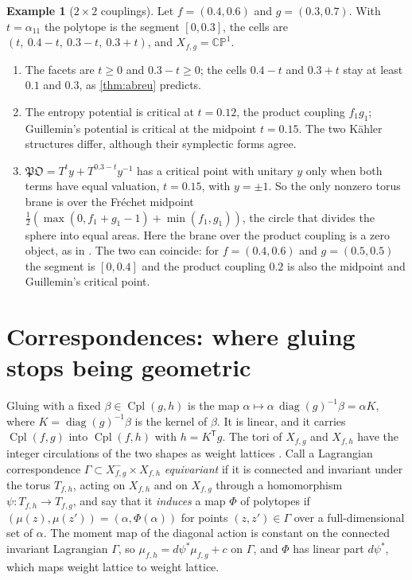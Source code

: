 \documentclass[11pt]{article}
\theoremstyle{definition}
\newtheorem{example}[theorem]{Example}
\theoremstyle{remark}
\newcommand{\Cpl}{\operatorname{Cpl}}
\newcommand{\diag}{\operatorname{diag}}
\newcommand{\T}{\mathsf T}
\begin{document}
\begin{example}[$2\times2$ couplings]\label{ex:twobytwo}
Let $f=(0.4,0.6)$ and $g=(0.3,0.7)$. With $t=\alpha_{11}$ the polytope is the segment $[0,0.3]$, the cells are
$(t,\ 0.4-t,\ 0.3-t,\ 0.3+t)$, and $X_{f,g}=\mathbb{CP}^1$.
\begin{enumerate}[label=(\roman*)]
\item The facets are $t\ge0$ and $0.3-t\ge0$; the cells $0.4-t$ and $0.3+t$ stay at least $0.1$ and $0.3$, as \cref{thm:abreu} predicts.
\item The entropy potential is critical at $t=0.12$, the product coupling $f_1g_1$; Guillemin's potential is critical at the midpoint
  $t=0.15$. The two Kähler structures differ, although their symplectic forms agree.
\item $\mathfrak{PO}=T^{t}y+T^{0.3-t}y^{-1}$ has a critical point with unitary $y$ only when both terms have equal valuation, $t=0.15$,
  with $y=\pm1$. So the only
  nonzero torus brane is over the Fréchet midpoint $\frac12(\max(0,f_1+g_1-1)+\min(f_1,g_1))$, the circle that divides the sphere into
  equal areas. Here the brane over the product coupling is a zero object, as in \cite[Prop.~10.11]{Conditionals}. The two can
  coincide: for $f=(0.4,0.6)$ and $g=(0.5,0.5)$ the segment is $[0,0.4]$ and the product coupling $0.2$ is also the midpoint and
  Guillemin's critical point.
\end{enumerate}
\end{example}

\section{Correspondences: where gluing stops being geometric}\label{sec:correspondences}

Gluing with a fixed $\beta\in\Cpl(g,h)$ is the map $\alpha\mapsto\alpha\,\diag(g)^{-1}\beta=\alpha K$, where $K=\diag(g)^{-1}\beta$ is the
kernel of $\beta$. It is linear, and it carries $\Cpl(f,g)$ into $\Cpl(f,h)$ with $h=K^\T g$. The tori of $X_{f,g}$ and $X_{f,h}$ have the
integer circulations of the two shapes as weight lattices \cite[Thm.~6.4]{Conditionals}. Call a Lagrangian correspondence
$\Gamma\subset X_{f,g}^-\times X_{f,h}$ \emph{equivariant} if it is connected and invariant under the torus $T_{f,h}$, acting on $X_{f,h}$ and on
$X_{f,g}$ through a homomorphism $\psi\colon T_{f,h}\to T_{f,g}$, and say that it \emph{induces} a map $\Phi$ of polytopes if
$(\mu(z),\mu(z'))=(\alpha,\Phi(\alpha))$ for points $(z,z')\in\Gamma$ over a full-dimensional set of $\alpha$. The moment map of the diagonal
action is constant on the connected invariant Lagrangian $\Gamma$, so $\mu_{f,h}=d\psi^*\mu_{f,g}+c$ on $\Gamma$, and $\Phi$ has linear part
$d\psi^*$, which maps weight lattice to weight lattice.
\end{document}
